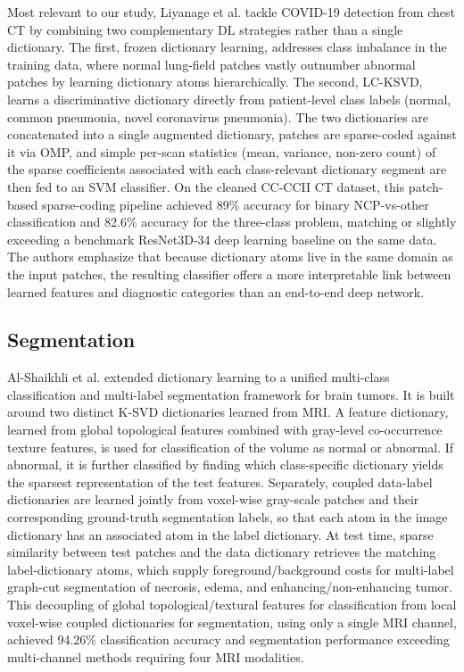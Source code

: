 Most relevant to our study, Liyanage et al.\cite{liyanage2022covid} tackle COVID-19 detection from
chest CT by combining two complementary DL strategies rather than a single dictionary. The first, frozen dictionary
learning, addresses class imbalance in the training data, where normal lung-field patches vastly outnumber abnormal patches by learning
dictionary atoms hierarchically. The second, LC-KSVD, learns a discriminative dictionary directly from patient-level class labels
(normal, common pneumonia, novel coronavirus pneumonia). The two dictionaries are concatenated into a single augmented
dictionary, patches are sparse-coded against it via OMP, and simple per-scan statistics (mean, variance,
non-zero count) of the sparse coefficients associated with each class-relevant dictionary segment are then fed to an SVM classifier.
On the cleaned CC-CCII CT dataset, this patch-based sparse-coding pipeline
achieved 89\% accuracy for binary NCP-vs-other classification and 82.6\% accuracy for the three-class problem, matching
or slightly exceeding a benchmark ResNet3D-34 deep learning baseline on the same data.
The authors emphasize that because dictionary atoms live in the same domain as the input patches, the resulting classifier offers a more
interpretable link between learned features and diagnostic categories than an end-to-end deep network.

\subsection{Segmentation}

Al-Shaikhli et al.\cite{alshaikhli2016brain} extended dictionary learning to a unified multi-class classification and multi-label segmentation framework
for brain tumors. It is built around two distinct K-SVD dictionaries learned from MRI.
A feature dictionary, learned from global topological features combined with gray-level co-occurrence texture features,
is used for classification of the volume as normal or abnormal. If abnormal, it is further classified by
finding which class-specific dictionary yields the sparsest representation of the test features.
Separately, coupled data-label dictionaries are learned jointly from voxel-wise gray-scale patches and their corresponding
ground-truth segmentation labels,
so that each atom in the image dictionary has an associated atom in the label dictionary. At test time, sparse similarity between
test patches and the data dictionary retrieves the matching label-dictionary atoms, which supply foreground/background costs for
multi-label graph-cut segmentation of necrosis, edema, and enhancing/non-enhancing tumor. This decoupling of global
topological/textural features for classification from local voxel-wise coupled dictionaries for segmentation, using only a single
MRI channel, achieved 94.26\% classification accuracy and segmentation performance exceeding multi-channel methods requiring four MRI modalities.

